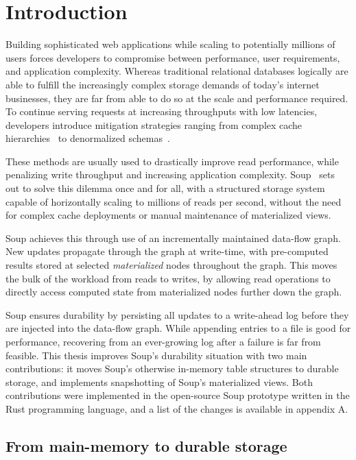 \chapter{Introduction}

Building sophisticated web applications while scaling to potentially millions of
users forces developers to compromise between performance, user requirements,
and application complexity. Whereas traditional relational databases logically
are able to fulfill the increasingly complex storage demands of today's internet
businesses, they are far from able to do so at the scale and performance
required. To continue serving requests at increasing throughputs with low
latencies, developers introduce mitigation strategies ranging from complex cache
hierarchies~\cite{memcached} to denormalized schemas~\cite{denormalization}.

These methods are usually used to drastically improve read performance, while
penalizing write throughput and increasing application complexity.
Soup~\cite{xylem} sets out to solve this dilemma once and for all, with a
structured storage system capable of horizontally scaling to millions of reads
per second, without the need for complex cache deployments or manual maintenance
of materialized views.

Soup achieves this through use of an incrementally maintained data-flow graph.
New updates propagate through the graph at write-time, with pre-computed results
stored at selected \textit{materialized} nodes throughout the graph. This
moves the bulk of the workload from reads to writes, by allowing read operations
to directly access computed state from materialized nodes further down the
graph.

Soup ensures durability by persisting all updates to a write-ahead log before
they are injected into the data-flow graph. While appending entries to a file is
good for performance, recovering from an ever-growing log after a failure is far
from feasible. This thesis improves Soup's durability situation with two main
contributions: it moves Soup's otherwise in-memory table structures to durable
storage, and implements snapshotting of Soup's materialized views. Both
contributions were implemented in the open-source Soup prototype written in the
Rust programming language, and a list of the changes is available in appendix A.

\newpage

\section{From main-memory to durable storage}

